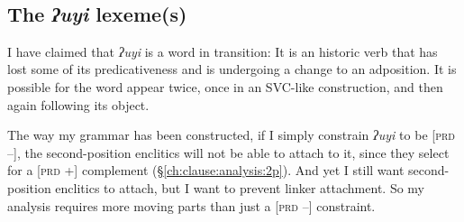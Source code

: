 \begin{singlespacing}
\ex~ \label{uunuutl-lexeme}
\xe
\end{singlespacing}

\subsection{The \textit{ʔuyi} lexeme(s)} \label{ch:link:analysis:uyi}

\vspace{-5pt}

I have claimed that \textit{ʔuyi} is a word in transition: It is an historic verb that has lost some of its predicativeness and is undergoing a change to an adposition. It is possible for the word appear twice, once in an SVC-like construction, and then again following its object.

The way my grammar has been constructed, if I simply constrain \textit{ʔuyi} to be [\textsc{prd} --], the second-position enclitics will not be able to attach to it, since they select for a [\textsc{prd} +] complement (\S\ref{ch:clause:analysis:2p}). And yet I still want second-position enclitics to attach, but I want to prevent linker attachment. So my analysis requires more moving parts than just a [\textsc{prd} --] constraint.

